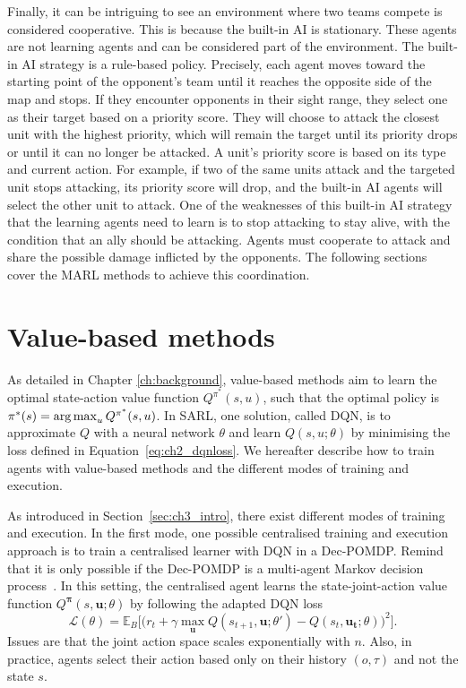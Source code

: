 Finally, it can be intriguing to see an environment where two teams compete is considered cooperative.
This is because the built-in AI is stationary. 
These agents are not learning agents and can be considered part of the environment.
The built-in AI strategy is a rule-based policy.
Precisely, each agent moves toward the starting point of the opponent's team until it reaches the opposite side of the map and stops.
If they encounter opponents in their sight range, they select one as their target based on a priority score.
They will choose to attack the closest unit with the highest priority, which will remain the target until its priority drops or until it can no longer be attacked.
A unit's priority score is based on its type and current action.
For example, if two of the same units attack and the targeted unit stops attacking, its priority score will drop, and the built-in AI agents will select the other unit to attack.
One of the weaknesses of this built-in AI strategy that the learning agents need to learn is to stop attacking to stay alive, with the condition that an ally should be attacking.
Agents must cooperate to attack and share the possible damage inflicted by the opponents.
The following sections cover the MARL methods to achieve this coordination.

\section{Value-based methods}
\label{sec:ch3_value}

As detailed in Chapter \ref{ch:background}, value-based methods aim to learn the optimal state-action value function $Q^{\pi^*}(s, u)$, such that the optimal policy is $\pi^*(s)=\operatorname*{arg\,max}_{u} Q^{\pi^*}(s, u)$.
In SARL, one solution, called DQN, is to approximate $Q$ with a neural network $\theta$ and learn $Q(s, u;\theta)$
by minimising the loss defined in Equation~\ref{eq:ch2_dqnloss}.
We hereafter describe how to train agents with value-based methods and the different modes of training and execution.

As introduced in Section~\ref{sec:ch3_intro}, there exist different modes of training and execution.
In the first mode, one possible centralised training and execution approach is to train a centralised learner with DQN in a Dec-POMDP.
Remind that it is only possible if the Dec-POMDP is a multi-agent Markov decision process~\citep{boutilier1996planning}.
In this setting, the centralised agent learns the state-joint-action value function $Q^{\mathbf{\pi}}(s,\mathbf{u}; \theta)$ by following the adapted DQN loss
\begin{equation}
\label{eq:ch3_centralQloss}
    \mathcal{L}(\theta) = \mathbb{E}_{B} \big[\big(r_{t} + \gamma \max_{\mathbf{u}} Q(s_{t+1}, \mathbf{u}; \theta')- Q(s_{t}, \mathbf{\mathbf{u_t}}; \theta)\big)^{2}\big].
\end{equation}
Issues are that the joint action space scales exponentially with $n$.
Also, in practice, agents select their action based only on their history $(o, \tau)$ and not the state $s$.

